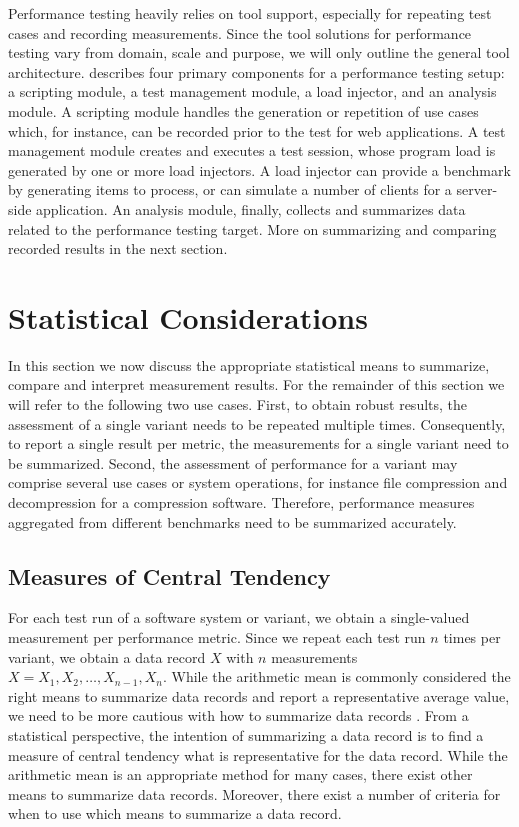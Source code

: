 Performance testing heavily relies on tool support, especially for repeating
test cases and recording measurements. Since the
tool solutions for performance testing vary from domain, scale and purpose, we
will only outline the general tool architecture. \cite{molyneaux_art_2014} describes
four primary components for a performance testing setup: a scripting module, a
test management module, a load injector, and an analysis module. A scripting module handles the generation or
repetition of use cases which, for instance, can be recorded prior to the test
for web applications. A test management module creates and executes a test
session, whose program load is generated by one or more load injectors. A load
injector can provide a benchmark by generating items to process, or can simulate
a number of clients for a server-side application. An analysis module, finally,
collects and summarizes data related to the performance testing target. More on
summarizing and comparing recorded results in the next section.

\section{Statistical Considerations}
In this section we now discuss the appropriate statistical means to summarize,
compare and interpret measurement results. For the remainder of this section we
will refer to the following two use cases. First, to obtain robust results, the
assessment of a single variant needs to be repeated multiple times.
Consequently, to report a single result per metric, the measurements for a
single variant need to be summarized. Second, the assessment of performance for
a variant may comprise several use cases or system operations, for instance file
compression and decompression for a compression software. Therefore, performance measures
aggregated from different benchmarks need to be summarized accurately. 

\subsection{Measures of Central Tendency}
For each test run of a software system or variant, we obtain a single-valued
measurement per performance metric. Since we repeat each test run $n$ times
per variant, we obtain a data record $X$ with $n$ measurements $X = X_1, X_2,
\ldots, X_{n-1}, X_n$. While the arithmetic mean is commonly considered the
right means to summarize data records and report a representative average
value, we need to be more cautious with how to summarize data records
\citep{fleming_how_1986,smith_characterizing_1988}. From a statistical
perspective, the intention of summarizing a data record is to find a measure of
central tendency what is representative for the data record.
While the arithmetic mean is an appropriate method for many cases, there exist
other means to summarize data records. Moreover, there exist a number of
criteria for when to use which means to summarize a data record. 

